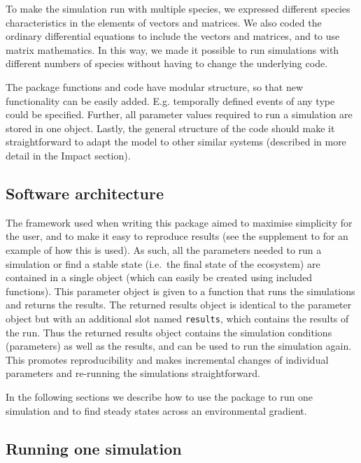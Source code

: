 \documentclass[]{elsarticle} %
\begin{document}
To make the simulation run with multiple species, we expressed different
species characteristics in the elements of vectors and matrices. We also
coded the ordinary differential equations to include the vectors and
matrices, and to use matrix mathematics. In this way, we made it
possible to run simulations with different numbers of species without
having to change the underlying code.

The package functions and code have modular structure, so that new
functionality can be easily added. E.g. temporally defined events of any
type could be specified. Further, all parameter values required to run a
simulation are stored in one object. Lastly, the general structure of
the code should make it straightforward to adapt the model to other
similar systems (described in more detail in the Impact section).

\hypertarget{software-architecture}{%
\subsection{Software architecture}\label{software-architecture}}

The framework used when writing this package aimed to maximise
simplicity for the user, and to make it easy to reproduce results (see
the supplement to \citet{Limberger2022} for an example of how this is
used). As such, all the parameters needed to run a simulation or find a
stable state (i.e.~the final state of the ecosystem) are contained in a
single object (which can easily be created using included functions).
This parameter object is given to a function that runs the simulations
and returns the results. The returned results object is identical to the
parameter object but with an additional slot named \texttt{results},
which contains the results of the run. Thus the returned results object
contains the simulation conditions (parameters) as well as the results,
and can be used to run the simulation again. This promotes
reproducibility and makes incremental changes of individual parameters
and re-running the simulations straightforward.

In the following sections we describe how to use the package to run one
simulation and to find steady states across an environmental gradient.

\hypertarget{running-one-simulation}{%
\subsection{Running one simulation}\label{running-one-simulation}}
\end{document}
